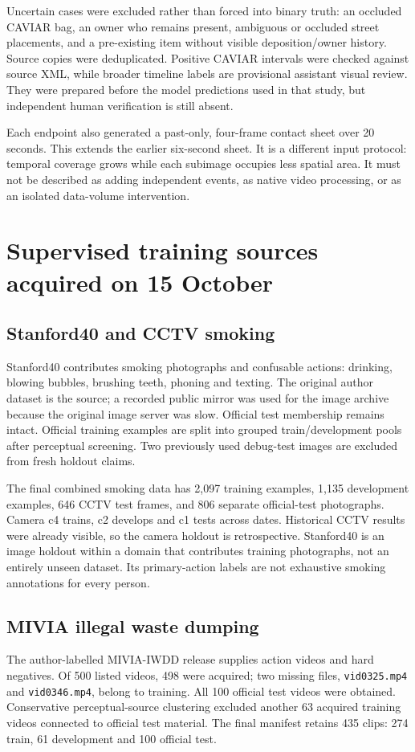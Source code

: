 Uncertain cases were excluded rather than forced into binary truth: an occluded CAVIAR bag, an owner who remains present, ambiguous or occluded street placements, and a pre-existing item without visible deposition/owner history. Source copies were deduplicated. Positive CAVIAR intervals were checked against source XML, while broader timeline labels are provisional assistant visual review. They were prepared before the model predictions used in that study, but independent human verification is still absent.

Each endpoint also generated a past-only, four-frame contact sheet over 20 seconds. This extends the earlier six-second sheet. It is a different input protocol: temporal coverage grows while each subimage occupies less spatial area. It must not be described as adding independent events, as native video processing, or as an isolated data-volume intervention.


\section{Supervised training sources acquired on 15 October}
\subsection{Stanford40 and CCTV smoking}
Stanford40 contributes smoking photographs and confusable actions: drinking, blowing bubbles, brushing teeth, phoning and texting. The original author dataset is the source; a recorded public mirror was used for the image archive because the original image server was slow. Official test membership remains intact. Official training examples are split into grouped train/development pools after perceptual screening. Two previously used debug-test images are excluded from fresh holdout claims.

The final combined smoking data has 2,097 training examples, 1,135 development examples, 646 CCTV test frames, and 806 separate official-test photographs. Camera c4 trains, c2 develops and c1 tests across dates. Historical CCTV results were already visible, so the camera holdout is retrospective. Stanford40 is an image holdout within a domain that contributes training photographs, not an entirely unseen dataset. Its primary-action labels are not exhaustive smoking annotations for every person.

\subsection{MIVIA illegal waste dumping}
The author-labelled MIVIA-IWDD release supplies action videos and hard negatives. Of 500 listed videos, 498 were acquired; two missing files, \texttt{vid0325.mp4} and \texttt{vid0346.mp4}, belong to training. All 100 official test videos were obtained. Conservative perceptual-source clustering excluded another 63 acquired training videos connected to official test material. The final manifest retains 435 clips: 274 train, 61 development and 100 official test.

